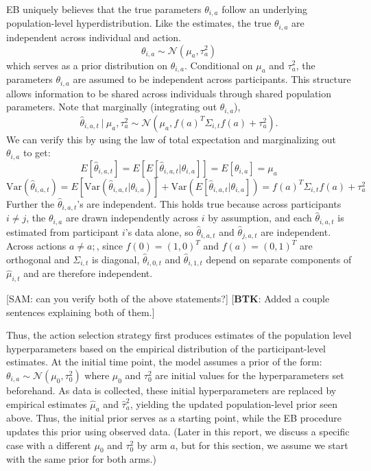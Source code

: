 \documentclass[letterpaper, 9pt]{extarticle}
\newcommand{\sam}[1]{
  {\color{blue} [SAM: {#1}]}
 }
\newcommand{\nys}[1]{%
  {\color{nyscolor} [\textbf{NYS}: {#1}]}%
}
\newcommand{\btk}[1]{%
  {\color{red} [\textbf{BTK}: {#1}]}%
}
\begin{document}
EB uniquely believes that the true parameters $\theta_{i,a}$ follow an underlying population-level hyperdistribution. Like the estimates, the true $\theta_{i,a}$ are independent across individual and action.  
\[
\theta_{i,a} \sim \mathcal{N}(\mu_{a}, \tau^2_{a})
\]
which serves as a prior distribution on $\theta_{i,a}$. Conditional on $\mu_a$ and $\tau_a^2$, the parameters $\theta_{i,a}$ are assumed to be independent across participants. This structure allows information to be shared across individuals through shared population parameters.   Note that marginally (integrating out $\theta_{i,a}$), 
\[
\hat{\theta}_{i,a,t} \ | \ \mu_{a},\tau^2_a \sim \mathcal{N}(\mu_{a}, f(a)^T \Sigma_{i,t}f(a)+\tau^2_a).
\]
We can verify this by using the law of total expectation and marginalizing out $\theta_{i,a}$ to get: 
\[E[\hat{\theta}_{i,a,t}] = E[E[\hat{\theta}_{i,a,t}|\theta_{i,a}]] = E[\theta_{i,a}] = \mu_a
\]
\[
\text{Var}(\hat{\theta}_{i,a,t}) = E[\text{Var}(\hat{\theta}_{i,a,t}|\theta_{i,a})] + \text{Var}(E[\hat{\theta}_{i,a,t}|\theta_{i,a}]) = f(a)^T \Sigma_{i,t}f(a) + \tau_a^2
\]
Further the $\hat{\theta}_{i,a,t}$'s are independent. This holds true because across participants $i\neq j$,  the $\theta_{i,a}$ are drawn independently across $i$ by assumption, and each $\hat{\theta}_{i,a,t}$ is estimated from participant $i$'s data alone, so $\hat{\theta}_{i,a,t}$ and $\hat{\theta}_{j,a,t}$ are independent. Across actions $a \neq a;$, since $f(0) = (1,0)^T$ and $f(a) = (0,1)^T$ are orthogonal and $\Sigma_{i,t}$ is diagonal, $\hat{\theta}_{i,0,t}$ and $\hat{\theta}_{i,1,t}$ depend on separate components of $\hat{\mu}_{i,t}$ and are therefore independent. 

\sam{can you verify both of the above statements?} \btk{Added a couple sentences explaining both of them.}


Thus, the action selection strategy first produces estimates of the population level hyperparameters based on the empirical distribution of the participant-level estimates. At the initial time point, the model assumes a prior of the form: $\theta_{i,a} \sim \mathcal{N}(\mu_{0},\tau_{0}^2)$
where $\mu_0$ and $\tau_0^2$ are initial values for the hyperparameters set beforehand. As data is collected, these initial hyperparameters are replaced by empirical estimates $\hat{\mu}_a$ and $\hat{\tau}_a^2$, yielding the updated population-level prior seen above. Thus, the initial prior serves as a starting point, while the EB procedure updates this prior using observed data. (Later in this report, we discuss a specific case with a different $\mu_0$ and $\tau^2_0$ by arm $a$, but for this section, we assume we start with the same prior for both arms.)
\end{document}
